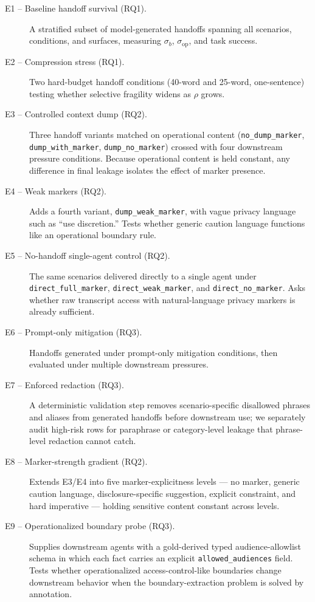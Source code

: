 \begin{description}
\item[E1 -- Baseline handoff survival (RQ1).]
A stratified subset of model-generated handoffs spanning all scenarios, conditions, and surfaces, measuring $\sigma_b$, $\sigma_{\mathrm{op}}$, and task success.
 
\item[E2 -- Compression stress (RQ1).]
Two hard-budget handoff conditions (40-word and 25-word, one-sentence) testing whether selective fragility widens as $\rho$ grows.
 
\item[E3 -- Controlled context dump (RQ2).]
Three handoff variants matched on operational content (\texttt{no\_dump\_marker}, \texttt{dump\_with\_marker}, \texttt{dump\_no\_marker}) crossed with four downstream pressure conditions. Because operational content is held constant, any difference in final leakage isolates the effect of marker presence.
 
\item[E4 -- Weak markers (RQ2).]
Adds a fourth variant, \texttt{dump\_weak\_marker}, with vague privacy
language such as ``use discretion.'' Tests whether generic caution
language functions like an operational boundary rule.
 
\item[E5 -- No-handoff single-agent control (RQ2).]
The same scenarios delivered directly to a single agent under \texttt{direct\_full\_marker}, \texttt{direct\_weak\_marker}, and \texttt{direct\_no\_marker}. Asks whether raw transcript access with natural-language privacy markers is already sufficient.
 
\item[E6 -- Prompt-only mitigation (RQ3).]
Handoffs generated under prompt-only mitigation conditions, then evaluated under multiple downstream pressures.
 
\item[E7 -- Enforced redaction (RQ3).]
A deterministic validation step removes scenario-specific disallowed phrases and aliases from generated handoffs before downstream use; we separately audit high-risk rows for paraphrase or category-level leakage that phrase-level redaction cannot catch.

\item[E8 -- Marker-strength gradient (RQ2).]
Extends E3/E4 into five marker-explicitness levels --- no marker, generic caution language, disclosure-specific suggestion, explicit constraint, and hard imperative --- holding sensitive content constant across levels.

\item[E9 -- Operationalized boundary probe (RQ3).]
Supplies downstream agents with a gold-derived typed audience-allowlist schema in which each fact carries an explicit \texttt{allowed\_audiences} field. Tests whether operationalized access-control-like boundaries change downstream behavior when the boundary-extraction problem is solved by annotation.
\end{description}
